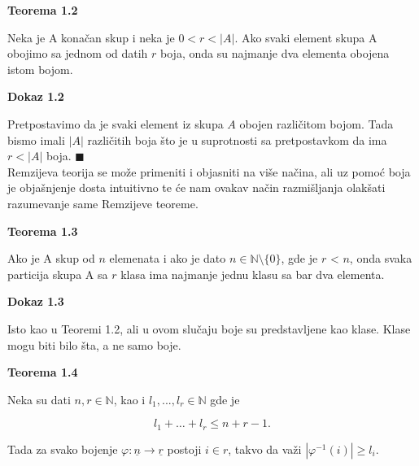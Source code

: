 \documentclass[12pt,a4paper]{article}
\begin{document}
	\vspace{0.5em}
	{\noindent\fontsize{12pt}{12pt}\textbf{Teorema 1.2}}
	\vspace{0.5em}

	\noindent Neka je A konačan skup i neka je $0 < r < |A|$.
	Ako svaki element skupa A obojimo sa jednom od datih $r$ boja, onda su najmanje dva
	elementa obojena istom bojom.
	\vspace{1.5em}

	{\noindent\fontsize{12pt}{12pt}\textbf{Dokaz 1.2}}
	\vspace{0.5em}	

	\noindent Pretpostavimo da je svaki element iz skupa $A$ obojen različitom bojom. Tada bismo
	imali $|A|$ različitih boja što je u suprotnosti sa pretpostavkom da ima $r < |A|$ boja.	$\blacksquare$\\

	\noindent Remzijeva teorija se može primeniti i objasniti na više načina, ali uz pomoć boja 
	je objašnjenje dosta intuitivno te će nam ovakav način razmišljanja olakšati razumevanje same Remzijeve teoreme.

	\vspace{0.5em}
	{\noindent\fontsize{12pt}{12pt}\textbf{Teorema 1.3}}
	\vspace{0.5em}

	\noindent Ako je A skup od $n$ elemenata i ako je dato $n \in \mathbb{N}\setminus \lbrace 0 \rbrace$, gde je $r$ < $n$, onda svaka particija
	skupa A sa $r$ klasa ima najmanje jednu klasu sa bar dva elementa.
	\vspace{1.5em}

	{\noindent\fontsize{12pt}{12pt}\textbf{Dokaz 1.3}}
	\vspace{0.5em}

	\noindent Isto kao u Teoremi 1.2, ali u ovom slučaju boje su predstavljene kao klase.
	Klase mogu biti bilo šta, a ne samo boje.

	\vspace{0.5em}
	{\noindent\fontsize{12pt}{12pt}\textbf{Teorema 1.4}}
	\vspace{0.5em}

	\noindent Neka su dati $n, r \in \mathbb{N}$, kao i $l_{1},...,l_{r} \in \mathbb{N}$ gde je
	
	\[l_{1}+\dots+l_{r} \leq n+r-1.\]

	\noindent Tada za svako bojenje $\varphi:\underline{n} \rightarrow \underline{r}$ postoji $i \in r$, takvo da važi $|\varphi^{-1}(i)| \geq l_{i}.$
	\vspace{1.5em}
\end{document}
